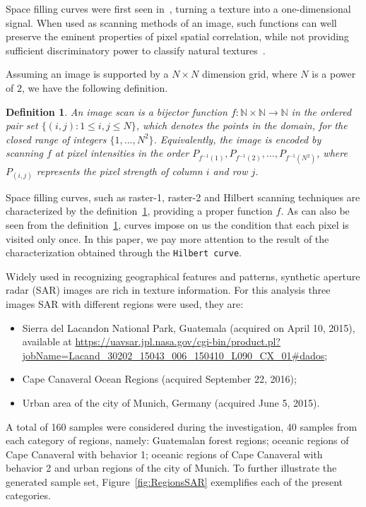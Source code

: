\documentclass{isprs}
\begin{document}
	Space filling curves were first seen in~\cite{Nguyen1982SpaceFC}, turning a texture into a one-dimensional signal.
	When used as scanning methods of an image, such functions can well preserve the eminent properties of pixel spatial correlation, while not providing sufficient discriminatory power to classify natural textures~\citep{Lee1994Texture}.
	
	Assuming an image is supported by a $N \times N$ dimension grid, where $N$ is a power of $2$, we have the following definition.
	
	\newtheorem{mydef}{Definition}
	\begin{mydef}
		An image scan is a bijector function $f \colon \mathbb{N} \times \mathbb{N} \to \mathbb{N}$ in the ordered pair set $ \{(i, j): 1 \leq i , j \leq N \}$, which denotes the points in the domain, for the closed range of integers $\{1, \dots, N^2\}$. Equivalently, the image is encoded by scanning $ f $ at pixel intensities in the order $P_{f^{-1}(1)}, P_{f^{-1}(2)}, \dots, P_{f^{-1}(N^2)}$, where $P_{(i, j)}$ represents the pixel strength of column $i$ and row $j$.
		\label{def:CurveFilling}
	\end{mydef}
	
	Space filling curves, such as raster-1, raster-2 and Hilbert scanning techniques are characterized by the definition~\ref{def:CurveFilling}, providing a proper function $f$.
	As can also be seen from the definition~\ref{def:CurveFilling}, curves impose on us the condition that each pixel is visited only once.
	In this paper, we pay more attention to the result of the characterization obtained through the \texttt{Hilbert curve}.
	
	Widely used in recognizing geographical features and patterns, synthetic aperture radar (SAR) images are rich in texture information. For this analysis three images SAR with different regions were used, they are:
	
	\begin{itemize}
		\item Sierra del Lacandon National Park, Guatemala (acquired on April 10, 2015), available at \url{https://uavsar.jpl.nasa.gov/cgi-bin/product.pl?jobName=Lacand_30202_15043_006_150410_L090_CX_01#dados};
		\item Cape Canaveral Ocean Regions (acquired September 22, 2016);
		\item Urban area of the city of Munich, Germany (acquired June 5, 2015).
	\end{itemize}
	
	A total of 160 samples were considered during the investigation, 40 samples from each category of regions, namely: Guatemalan forest regions; oceanic regions of Cape Canaveral with behavior 1; oceanic regions of Cape Canaveral with behavior 2 and urban regions of the city of Munich. To further illustrate the generated sample set, Figure~\ref{fig:RegionsSAR} exemplifies each of the present categories.
	
\end{document}
